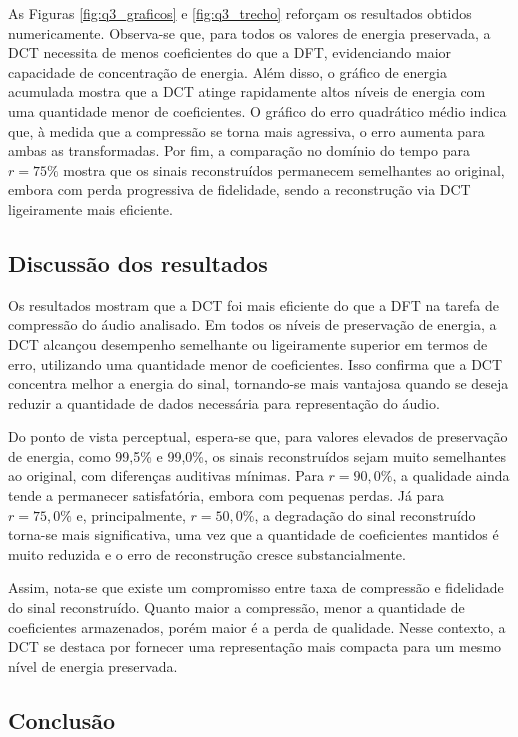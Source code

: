 \documentclass[12pt,a4paper]{article}
\begin{document}
As Figuras \ref{fig:q3_graficos} e \ref{fig:q3_trecho} reforçam os resultados obtidos numericamente. Observa-se que, para todos os valores de energia preservada, a DCT necessita de menos coeficientes do que a DFT, evidenciando maior capacidade de concentração de energia. Além disso, o gráfico de energia acumulada mostra que a DCT atinge rapidamente altos níveis de energia com uma quantidade menor de coeficientes. O gráfico do erro quadrático médio indica que, à medida que a compressão se torna mais agressiva, o erro aumenta para ambas as transformadas. Por fim, a comparação no domínio do tempo para \(r=75\%\) mostra que os sinais reconstruídos permanecem semelhantes ao original, embora com perda progressiva de fidelidade, sendo a reconstrução via DCT ligeiramente mais eficiente.

\subsection{Discussão dos resultados}

Os resultados mostram que a DCT foi mais eficiente do que a DFT na tarefa de compressão do áudio analisado. Em todos os níveis de preservação de energia, a DCT alcançou desempenho semelhante ou ligeiramente superior em termos de erro, utilizando uma quantidade menor de coeficientes. Isso confirma que a DCT concentra melhor a energia do sinal, tornando-se mais vantajosa quando se deseja reduzir a quantidade de dados necessária para representação do áudio.

Do ponto de vista perceptual, espera-se que, para valores elevados de preservação de energia, como 99,5\% e 99,0\%, os sinais reconstruídos sejam muito semelhantes ao original, com diferenças auditivas mínimas. Para \(r=90{,}0\%\), a qualidade ainda tende a permanecer satisfatória, embora com pequenas perdas. Já para \(r=75{,}0\%\) e, principalmente, \(r=50{,}0\%\), a degradação do sinal reconstruído torna-se mais significativa, uma vez que a quantidade de coeficientes mantidos é muito reduzida e o erro de reconstrução cresce substancialmente.

Assim, nota-se que existe um compromisso entre taxa de compressão e fidelidade do sinal reconstruído. Quanto maior a compressão, menor a quantidade de coeficientes armazenados, porém maior é a perda de qualidade. Nesse contexto, a DCT se destaca por fornecer uma representação mais compacta para um mesmo nível de energia preservada.

\subsection{Conclusão}
\end{document}
